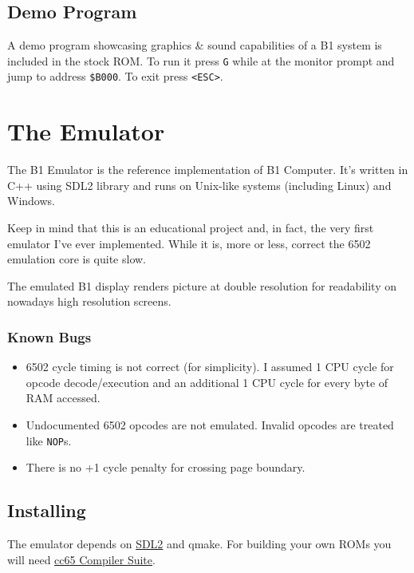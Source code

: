 \documentclass[a4paper,10pt,oneside]{article}
\begin{document}
\subsection{Demo Program}
A demo program showcasing graphics \& sound capabilities of a B1 system is included in the stock ROM. To run it press \texttt{G} while at the monitor prompt and jump to address \texttt{\$B000}. To exit press \texttt{<ESC>}.

\section{The Emulator}
The B1 Emulator is the reference implementation of B1 Computer. It's written in C++ using SDL2 library and runs on Unix-like systems (including Linux) and Windows.

Keep in mind that this is an educational project and, in fact, the very first emulator I've ever implemented. While it is, more or less, correct the 6502 emulation core is quite slow.

The emulated B1 display renders picture at double resolution for readability on nowadays high resolution screens.

\subsubsection*{Known Bugs}
\begin{itemize}
  \item 6502 cycle timing is not correct (for simplicity). I assumed 1 CPU cycle for opcode decode/execution and an additional 1 CPU cycle for every byte of RAM accessed.
  \item	Undocumented 6502 opcodes are not emulated. Invalid opcodes are treated like \texttt{NOP}s.
  \item There is no +1 cycle penalty for crossing page boundary.
\end{itemize}

\subsection{Installing}
\label{sec:installing}
The emulator depends on \href{https://www.libsdl.org/download-2.0.php}{SDL2} and qmake. For building your own ROMs you will need \href{http://cc65.github.io/cc65/}{cc65 Compiler Suite}.
\end{document}
